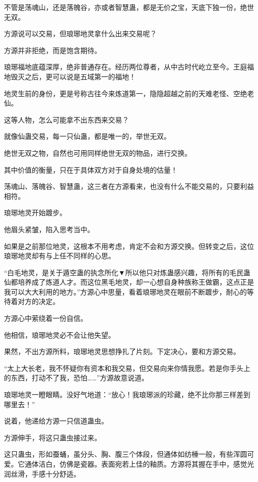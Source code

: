 
\begin{this_body}

不管是荡魂山，还是落魄谷，亦或者智慧蛊，都是无价之宝，天底下独一份，绝世无双。

方源说可以交易，但琅琊地灵拿什么出来交易呢？

方源并非拒绝，而是饱含期待。

琅琊福地底蕴深厚，绝非普通存在。经历两位尊者，从中古时代屹立至今。王庭福地毁灭之后，更可以说是五域第一的福地！

地灵生前的身份，更是号称古往今来炼道第一，隐隐超越之前的天难老怪、空绝老仙。

这等人物，怎么可能拿不出东西来交易？

就像仙蛊交易，每一只仙蛊，都是唯一的，举世无双。

绝世无双之物，自然也可用同样绝世无双的物品，进行交换。

其中价值的衡量，只在于具体双方对于自身处境的估量！

荡魂山、落魄谷、智慧蛊，这三者在方源看来，也没有什么不能交易的，只要利益相符。

琅琊地灵开始踱步。

他眉头紧皱，陷入思考当中。

如果是之前那位地灵，这根本不用考虑，肯定不会和方源交换。但转变之后，这位琅琊地灵却有与上任不同样的心思。

“白毛地灵，是关于遁空蛊的执念所化▼所以他只对炼蛊感兴趣，将所有的毛民蛊仙都培养成了炼道人才。而这位黑毛地灵，却一心想自身种族称王做霸，这点正是我可以大大利用的地方。”方源心中思量，看着琅琊地灵在眼前不断踱步，耐心的等待着对方的决定。

方源心中萦绕着一份自信。

他相信，琅琊地灵必不会让他失望。

果然，不出方源所料，琅琊地灵思想挣扎了片刻。下定决心，要和方源交易。

“太上大长老，我不怀疑你有资本和我交易，但交易向来你情我愿。若是你手头上的东西，打动不了我，恐怕……”方源故意说道。

琅琊地灵一瞪眼睛。没好气地道：“放心！我琅琊派的珍藏，绝不比你那三样差到哪里去！”

说着，他递给方源一只信道蛊虫。

方源伸手，将这只蛊虫接过来。

这只蛊虫，形如蚕蛹，虽分头、胸、腹三个体段，但通体如纺棰一般，有些浑圆可爱。它通体洁白，仿佛是瓷器。表面宛若上佳的釉质。方源将其握在手中，感觉光润丝滑，手感十分舒适。


\end{this_body}
